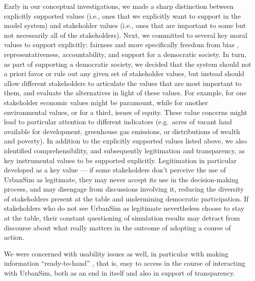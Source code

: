 Early in our conceptual investigations, we made a sharp distinction between
explicitly supported values (i.e., ones that we explicitly want to support
in the model system) and stakeholder values (i.e., ones that are important
to some but not necessarily all of the stakeholders).  Next, we committed
to several key moral values to support explicitly: fairness and more
specifically freedom from bias \cite{friedman-tois-1996},
representativeness, accountability, and support for a democratic society.
In turn, as part of supporting a democratic society, we decided that the
system should not a priori favor or rule out any given set of stakeholder
values, but instead should allow different stakeholders to articulate the
values that are most important to them, and evaluate the alternatives in
light of these values.  For example, for one stakeholder economic values
might be paramount, while for another environmental values, or for a third,
issues of equity.  These value concerns might lead to particular attention
to different indicators (e.g.\ acres of vacant land available for
development, greenhouse gas emissions, or distributions of wealth and
poverty).  In addition to the explicitly supported values listed above, we
also identified comprehensibility, and subsequently legitimation and
transparency, as key instrumental values to be supported explicitly.
Legitimation in particular developed as a key value --- if some
stakeholders don't perceive the use of UrbanSim as legitimate, they may
never accept its use in the decision-making process, and may disengage from
discussions involving it, reducing the diversity of stakeholders present at
the table and undermining democratic participation.  If stakeholders who do
not see UrbanSim as legitimate nevertheless choose to stay at the table, their
constant questioning of simulation results may detract from discourse about
what really matters in the outcome of adopting a course of action.

We were concerned with usability issues as well, in particular with making
information ``ready-to-hand'' \cite{winograd-flores-book-1986}, that is,
easy to access in the course of interacting with UrbanSim, both as an end
in itself and also in support of transparency.

